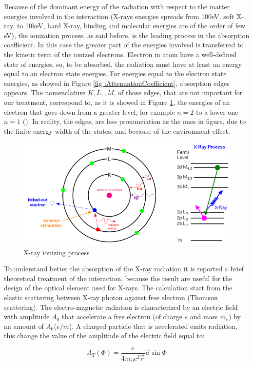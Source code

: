 Because of the dominant energy of the radiation with respect to the matter energies involved in the interaction (X-rays energies spreads from 100eV, soft X-ray, to 10keV, hard X-ray, binding and molecular energies are of the order of few eV), the ionization process, as said before, is the leading process in the absorption coefficient. In this case the greater part of the energies involved is transferred to the kinetic term of the ionized electrons. Electron in atom have a well-defined state of energies, so, to be absorbed, the radiation must have at least an energy equal to an electron state energies. For energies equal to the electron state energies, as showed in Figure \ref{fig :AttenuationCoefficient}, absorption edges appears. The nomenclature $K,L,,M $, of those edges, that are not important for our treatment, correspond to, as it is showed in Figure \ref{fig: KLM}, the energies of an electron that goes down from a greater level, for example $n=2 $ to a lower one $n=1 $ (\cite{agarwal1991interaction}). In reality, the edges, are less pronunciation as the ones in figure, due to the finite energy width of the states, and because of the environment effect.
\\
\begin{figure}[]
%
\centering
%
\includegraphics[width=.6\textwidth]{Immagini/Chapter1/KLM}
%
\caption{X-ray ionizing process}
%
\label{fig: KLM}
%
\end{figure}
To understand better the absorption of the X-ray radiation it is reported a brief theoretical treatment of the interaction, because the result are useful for the design of the optical element used for X-rays. The calculation start from the elastic scattering between  X-ray photon against free electron (Thomson scattering). The electro-magnetic radiation is characterized by an electric field with amplitude $A_0$ that accelerate a free electron (of charge $e $ and mass $m_e $) by an amount of $A_0 $($e / m $). A charged particle that is accelerated emits radiation, this change the value of the amplitude of the electric field equal to:

\begin{equation}
A_T(\Phi) = \frac{e}{4 \pi \epsilon_0 c^2 \vec{r}} \vec{a} \sin \Phi
\label{eq: At1}
\end{equation}

